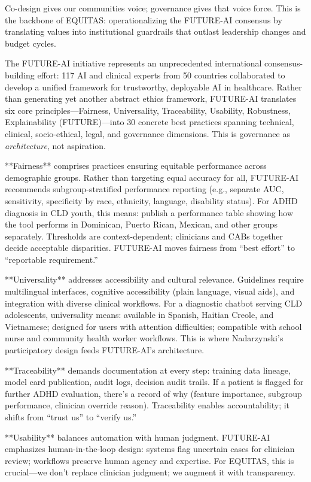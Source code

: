 \documentclass[12pt,twoside]{article}
\begin{document}
Co-design gives our communities voice; governance gives that voice force. This is the backbone of EQUITAS: operationalizing the FUTURE-AI consensus by translating values into institutional guardrails that outlast leadership changes and budget cycles.

The FUTURE-AI initiative represents an unprecedented international consensus-building effort: 117 AI and clinical experts from 50 countries collaborated to develop a unified framework for trustworthy, deployable AI in healthcare. Rather than generating yet another abstract ethics framework, FUTURE-AI translates six core principles—Fairness, Universality, Traceability, Usability, Robustness, Explainability (FUTURE)---into 30 concrete best practices spanning technical, clinical, socio-ethical, legal, and governance dimensions. This is governance as \emph{architecture}, not aspiration.

**Fairness** comprises practices ensuring equitable performance across demographic groups. Rather than targeting equal accuracy for all, FUTURE-AI recommends subgroup-stratified performance reporting (e.g., separate AUC, sensitivity, specificity by race, ethnicity, language, disability status). For ADHD diagnosis in CLD youth, this means: publish a performance table showing how the tool performs in Dominican, Puerto Rican, Mexican, and other groups separately. Thresholds are context-dependent; clinicians and CABs together decide acceptable disparities. FUTURE-AI moves fairness from ``best effort'' to ``reportable requirement.''

**Universality** addresses accessibility and cultural relevance. Guidelines require multilingual interfaces, cognitive accessibility (plain language, visual aids), and integration with diverse clinical workflows. For a diagnostic chatbot serving CLD adolescents, universality means: available in Spanish, Haitian Creole, and Vietnamese; designed for users with attention difficulties; compatible with school nurse and community health worker workflows. This is where Nadarzynski's participatory design feeds FUTURE-AI's architecture.

**Traceability** demands documentation at every step: training data lineage, model card publication, audit logs, decision audit trails. If a patient is flagged for further ADHD evaluation, there's a record of why (feature importance, subgroup performance, clinician override reason). Traceability enables accountability; it shifts from ``trust us'' to ``verify us.''

**Usability** balances automation with human judgment. FUTURE-AI emphasizes human-in-the-loop design: systems flag uncertain cases for clinician review; workflows preserve human agency and expertise. For EQUITAS, this is crucial—we don't replace clinician judgment; we augment it with transparency.
\end{document}
